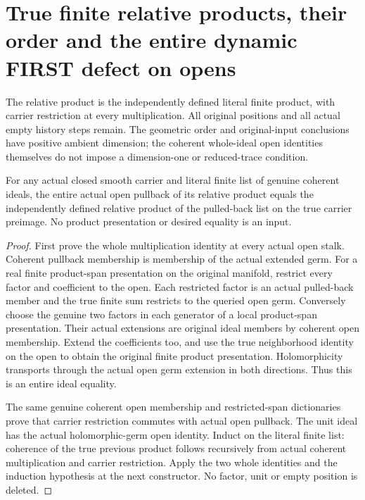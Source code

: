 \section{True finite relative products, their order and the entire dynamic FIRST defect on opens}

The relative product is the independently defined literal finite product,
with carrier restriction at every multiplication. All original positions and
all actual empty history steps remain. The geometric order and original-input
conclusions have positive ambient dimension; the coherent whole-ideal open
identities themselves do not impose a dimension-one or reduced-trace condition.

\begin{theorem}
\label{hir:sharp-actual-relative-finite-product-open}
\leanok
For any actual closed smooth carrier and literal finite list of genuine coherent
ideals, the entire actual open pullback of its relative product equals the
independently defined relative product of the pulled-back list on the true
carrier preimage. No product presentation or desired equality is an input.
\end{theorem}
\begin{proof}
First prove the whole multiplication identity at every actual open stalk.
Coherent pullback membership is membership of the actual extended germ.
For a real finite product-span presentation on the original manifold,
restrict every factor and coefficient to the open. Each restricted factor is
an actual pulled-back member and the true finite sum restricts to the queried
open germ. Conversely choose the genuine two factors in each generator of a
local product-span presentation. Their actual extensions are original ideal
members by coherent open membership. Extend the coefficients too, and use
the true neighborhood identity on the open to obtain the original finite
product presentation. Holomorphicity transports through the actual open
germ extension in both directions. Thus this is an entire ideal equality.

The same genuine coherent open membership and restricted-span dictionaries
prove that carrier restriction commutes with actual open pullback. The unit
ideal has the actual holomorphic-germ open identity. Induct on the literal
finite list: coherence of the true previous product follows recursively from
actual coherent multiplication and carrier restriction. Apply the two whole
identities and the induction hypothesis at the next constructor. No factor,
unit or empty position is deleted.
\end{proof}

